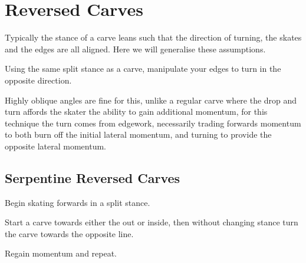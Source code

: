 \section{Reversed Carves}
\label{sec:sticky/reverse_carves}

Typically the stance of a carve leans such that the direction of turning, the skates and the edges are all aligned.    
Here we will generalise these assumptions. 


Using the same split stance as a carve, manipulate your edges to turn in the opposite direction. 


Highly oblique angles are fine for this, unlike a regular carve where the drop and turn affords the skater the ability to gain additional momentum, for this technique the turn comes from edgework, necessarily trading forwards momentum to both burn off the initial lateral momentum, and turning to provide the opposite lateral momentum.    

\subsection*{Serpentine Reversed Carves}
\label{drill:sticky/reverse_carves/serpentine}

Begin skating forwards in a split stance.

Start a carve towards either the out or inside, then without changing stance turn the carve towards the opposite line. 

Regain momentum and repeat.
